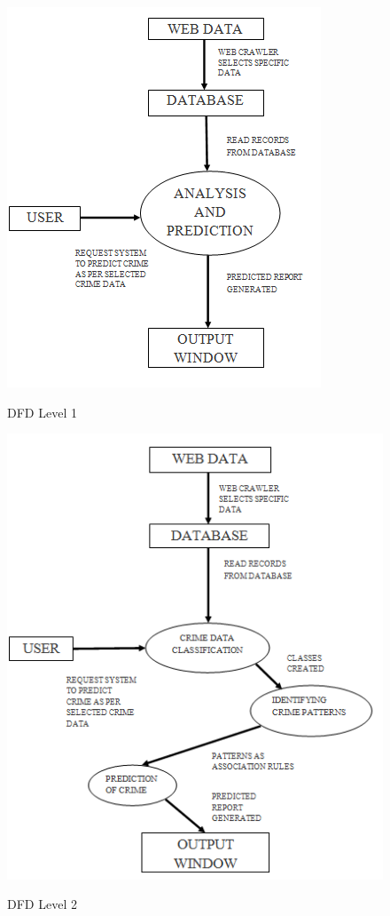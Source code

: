 \documentclass[12pt]{extreport}
\begin{document}
    \begin{figure}[H]
    \centering
  \includegraphics[scale=1.3]{DFDONE.png}\\
  \caption{DFD Level 1}
  
\end{figure}

    \begin{figure}[H]
    \centering
  \includegraphics[scale=1.2]{DFDTWO.png}\\
  \caption{DFD Level 2}
  
\end{figure}
     \pagebreak
\end{document}
